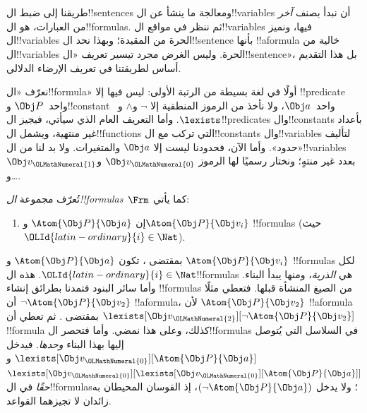 \documentclass[../../../include/open-logic-section]{subfiles}
\begin{document}

\section{}

طريقنا إلى ضبط ال!!{sentence}s ومعالجة ما ينشأ عن ال!!{variable}s
أن نبدأ بصنف \emph{آخر} من العبارات، هو ال!!{formula}s. ثم
ننظر في مواقع ال!!{variable}s فيها، ونميز ال!!{variable}s الحرة
من المقيدة؛ وبهذا نحد ال!!{sentence} بأنها !!a{formula} خالية
من ال!!{variable}s الحرة. وليس الغرض مجرد تيسير تعريف
«ال!!{sentence}»، بل هذا التقديم أساس لطريقتنا في تعريف الإرضاء
الدلالي.

نعرّف «ال!!{formula}» أولًا في لغة بسيطة من الرتبة الأولى: ليس
فيها إلا !!{predicate} واحد~$\Obj P$ و!!{constant} واحد~$\Obj a$،
ولا نأخذ من الرموز المنطقية إلا $\lnot$ و$\land$ و~$\lexists$.
وأما التعريف العام الذي سيأتي، فيجيز ال!!{predicate}s
وال!!{constant}s بأعداد غير منتهية، ويشمل ال!!{function}s التي
تركب مع ال!!{constant}s وال!!{variable}s لتأليف «حدود». وأما الآن،
فحدودنا ليست إلا $\Obj a$ والمتغيرات. ولا بد لنا من
ال!!{variable}s بعدد غير منتهٍ؛ ونختار رسميًا لها الرموز
$\Obj v_{\OLMathNumeral{0}}$ و$\Obj v_{\OLMathNumeral{1}}$ و\dots.

\begin{defn}
تُعرّف مجموعة \emph{ال!!{formula}s}~$\Frm$ كما يأتي:
\begin{enumerate}
\item{} إن $\Atom{\Obj P}{\Obj a}$ و$\Atom{\Obj
  P}{\Obj v_i}$ !!{formula}s (حيث ${\OLId{latin-ordinary}{i}} \in \Nat$).




\end{enumerate}
\end{defn}

بمقتضى ، تكون $\Atom{\Obj P}{\Obj a}$ و
$\Atom{\Obj P}{\Obj v_i}$ !!{formula}s لكل ${\OLId{latin-ordinary}{i}} \in \Nat$.
هذه ال!!{formula}s هي \emph{الذرية}، ومنها يبدأ البناء.
وأما سائر البنود فتمدنا بطرائق إنشاء !!{formula}s من الصيغ
المنشأة قبلها. فتعطي  مثلًا أن
$\lnot \Atom{\Obj P}{\Obj v_2}$ !!a{formula}، لأن
$\Atom{\Obj P}{\Obj v_2}$ !!a{formula} بمقتضى
. ثم تعطي  أن
$\lexists[\Obj v_{\OLMathNumeral{2}}][\lnot \Atom{\Obj P}{\Obj v_2}]$
!!{formula} كذلك، وعلى هذا نمضي. وأما  فتحصر
ال!!{formula}s في السلاسل التي يُتوصل إليها بهذا البناء
\emph{وحدها}. فيدخل
$\lexists[\Obj v_{\OLMathNumeral{0}}][\Atom{\Obj P}{\Obj a}]$ و
$\lexists[\Obj v_{\OLMathNumeral{0}}][\lexists[\Obj v_{\OLMathNumeral{0}}][\Atom{\Obj P}{\Obj a}]]$
\emph{حقًا} في ال!!{formula}s؛ ولا يدخل
$(\lnot \Atom{\Obj P}{\Obj a})$، إذ القوسان المحيطان به زائدان
لا تجيزهما القواعد.
\end{document}
